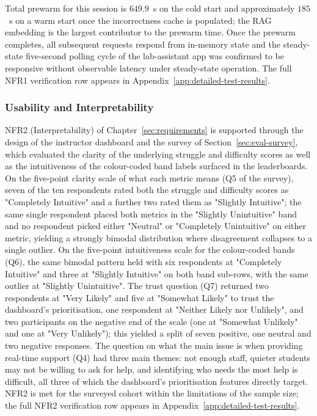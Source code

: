 Total prewarm for this session is $649.9$~s on the cold start and approximately $185$~s on a warm start once the incorrectness cache is populated; the RAG embedding is the largest contributor to the prewarm time.
Once the prewarm completes, all subsequent requests respond from in-memory state and the steady-state five-second polling cycle of the lab-assistant app was confirmed to be responsive without observable latency under steady-state operation.
The full NFR1 verification row appears in Appendix~\ref{app:detailed-test-results}.

\subsubsection{Usability and Interpretability} \label{sec:eval-usability}

NFR2 (Interpretability) of Chapter~\ref{sec:requirements} is supported through the design of the instructor dashboard and the survey of Section~\ref{sec:eval-survey}, which evaluated the clarity of the underlying struggle and difficulty scores as well as the intuitiveness of the colour-coded band labels surfaced in the leaderboards. 
On the five-point clarity scale of what each metric means (Q5 of the survey), seven of the ten respondents rated both the struggle and difficulty scores as "Completely Intuitive" and a further two rated them as "Slightly Intuitive"; the same single respondent placed both metrics in the "Slightly Unintuitive" band and no respondent picked either "Neutral" or "Completely Unintuitive" on either metric, yielding a strongly bimodal distribution where disagreement collapses to a single outlier.
On the five-point intuitiveness scale for the colour-coded bands (Q6), the same bimodal pattern held with six respondents at "Completely Intuitive" and three at "Slightly Intuitive" on both band sub-rows, with the same outlier at "Slightly Unintuitive".
The trust question (Q7) returned two respondents at "Very Likely" and five at "Somewhat Likely" to trust the dashboard's prioritisation, one respondent at "Neither Likely nor Unlikely", and two participants on the negative end of the scale (one at "Somewhat Unlikely" and one at "Very Unlikely"); this yielded a split of seven positive, one neutral and two negative responses.
The question on what the main issue is when providing real-time support (Q4) had three main themes: not enough staff, quieter students may not be willing to ask for help, and identifying who needs the most help is difficult, all three of which the dashboard's prioritisation features directly target.
NFR2 is met for the surveyed cohort within the limitations of the sample size; the full NFR2 verification row appears in Appendix~\ref{app:detailed-test-results}.


